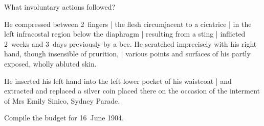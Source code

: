 What involuntary actions followed?

\Science
He compressed between 2~fingers |
the flesh circumjacent to a cicatrice |
in the left infracostal region below the diaphragm |
resulting from a sting |
inflicted 2~weeks and 3~days previously
by a bee.
He scratched imprecisely with his right hand,
though insensible of prurition, |
various points and surfaces of his partly exposed, wholly abluted skin.

\Factual
He inserted his left hand into the left lower pocket of his waistcoat |
and extracted and replaced a silver coin
placed there
on the occasion
of the interment of Mrs Emily Sinico, Sydney Parade.


Compile the budget for 16~June 1904.

\newcommand{\fjnl}{\Title{Freeman's J$^{\textit{nl}}$}}

\Roger

